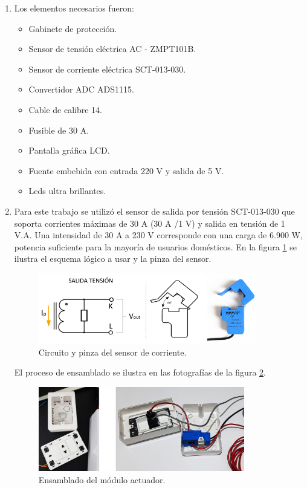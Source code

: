 \begin{enumerate}
\item {}

Los elementos necesarios fueron:
\begin{itemize}
\item Gabinete de protección.
\item Sensor de tensión eléctrica AC - ZMPT101B.
\item Sensor de corriente eléctrica SCT-013-030.
\item Convertidor ADC ADS1115.
\item Cable de calibre 14.
\item Fusible de 30 A.
\item Pantalla gráfica LCD.
\item Fuente embebida con entrada 220 V y salida de 5 V.
\item Leds ultra brillantes.
\end{itemize}

\item {}

Para este trabajo se utilizó el sensor de salida por tensión SCT-013-030 que soporta corrientes máximas de 30 A (30 A /1 V) y salida en tensión de 1 V.A. Una intensidad de 30 A a 230 V corresponde con una carga de 6.900 W, potencia suficiente para la mayoría de usuarios domésticos. En la figura \ref{fig:consumo1} se ilustra el esquema lógico a usar y la pinza del sensor.
\vspace{0.5cm}
\begin{figure}[htpb]
\centering 
\includegraphics[width=0.9\textwidth]{./Figures/consumo1.png}
\caption{Circuito y pinza del sensor de corriente. }
\label{fig:consumo1}
\end{figure}

El proceso de ensamblado se ilustra en las fotografías de la figura \ref{fig:armadoactuador}.

\begin{figure}[htpb]
\centering 
\includegraphics[width=0.85\textwidth]{./Figures/armadoactuador.jpg}
\caption{Ensamblado del módulo actuador. }
\label{fig:armadoactuador}
\end{figure}



\end{enumerate}
